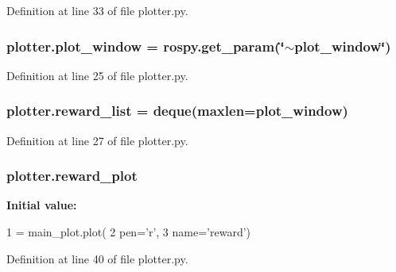 Definition at line 33 of file plotter.\+py.

\subsubsection[{\texorpdfstring{plot\+\_\+window}{plot_window}}]{\setlength{\rightskip}{0pt plus 5cm}plotter.\+plot\+\_\+window = rospy.\+get\+\_\+param(\char`\"{}$\sim$plot\+\_\+window\char`\"{})}\hypertarget{namespaceplotter_abbb49ab9c0174321374123fd800937f1}{}\label{namespaceplotter_abbb49ab9c0174321374123fd800937f1}


Definition at line 25 of file plotter.\+py.

\subsubsection[{\texorpdfstring{reward\+\_\+list}{reward_list}}]{\setlength{\rightskip}{0pt plus 5cm}plotter.\+reward\+\_\+list = deque(maxlen={\bf plot\+\_\+window})}\hypertarget{namespaceplotter_aa648ebbb57476267f9430be51eeb420c}{}\label{namespaceplotter_aa648ebbb57476267f9430be51eeb420c}


Definition at line 27 of file plotter.\+py.

\subsubsection[{\texorpdfstring{reward\+\_\+plot}{reward_plot}}]{\setlength{\rightskip}{0pt plus 5cm}plotter.\+reward\+\_\+plot}\hypertarget{namespaceplotter_a40062593c153ab9d59f836890f82dfc7}{}\label{namespaceplotter_a40062593c153ab9d59f836890f82dfc7}
{\bfseries Initial value\+:}
\begin{DoxyCode}
1 = main\_plot.plot(
2     pen=\textcolor{stringliteral}{'r',}
3 \textcolor{stringliteral}{    name='reward'})
\end{DoxyCode}


Definition at line 40 of file plotter.\+py.

